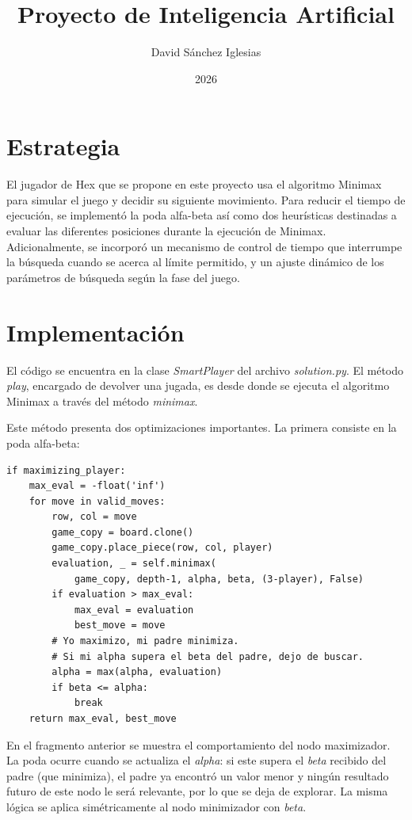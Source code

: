\documentclass[spanish]{article}
\title{Proyecto de Inteligencia Artificial}
\author{David Sánchez Iglesias}
\date{2026}
\begin{document}
\maketitle

\section{Estrategia}
El jugador de Hex que se propone en este proyecto usa el algoritmo Minimax para simular el juego y decidir su siguiente movimiento. Para reducir el tiempo de ejecuci\'on, se implement\'o la poda alfa-beta as\'i como dos heur\'isticas destinadas a evaluar las diferentes posiciones durante la ejecuci\'on de Minimax. Adicionalmente, se incorpor\'o un mecanismo de control de tiempo que interrumpe la b\'usqueda cuando se acerca al l\'imite permitido, y un ajuste din\'amico de los par\'ametros de b\'usqueda seg\'un la fase del juego.

\section{Implementaci\'on}
El c\'odigo se encuentra en la clase \textit{SmartPlayer} del archivo \textit{solution.py}. El m\'etodo \textit{play}, encargado de devolver una jugada, es desde donde se ejecuta el algoritmo Minimax a trav\'es del m\'etodo \textit{minimax}.

Este m\'etodo presenta dos optimizaciones importantes. La primera consiste en la poda alfa-beta:

\begin{lstlisting}
if maximizing_player:
    max_eval = -float('inf')
    for move in valid_moves:
        row, col = move
        game_copy = board.clone()
        game_copy.place_piece(row, col, player)
        evaluation, _ = self.minimax(
            game_copy, depth-1, alpha, beta, (3-player), False)
        if evaluation > max_eval:
            max_eval = evaluation
            best_move = move
        # Yo maximizo, mi padre minimiza.
        # Si mi alpha supera el beta del padre, dejo de buscar.
        alpha = max(alpha, evaluation)
        if beta <= alpha:
            break
    return max_eval, best_move
\end{lstlisting}

En el fragmento anterior se muestra el comportamiento del nodo maximizador. La poda ocurre cuando se actualiza el \textit{alpha}: si este supera el \textit{beta} recibido del padre (que minimiza), el padre ya encontr\'o un valor menor y ning\'un resultado futuro de este nodo le ser\'a relevante, por lo que se deja de explorar. La misma l\'ogica se aplica sim\'etricamente al nodo minimizador con \textit{beta}.
\end{document}
